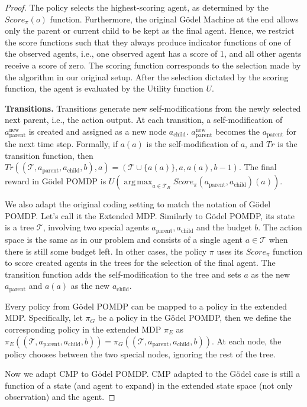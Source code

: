 \documentclass{article}
\DeclareMathOperator*{\argmax}{arg\,max}
\begin{document}
\begin{proof}
The policy selects the highest-scoring agent, as determined by the $Score_\pi(o)$ function. Furthermore, the original G\"odel Machine at the end allows only the parent or current child to be kept as the final agent. Hence, we restrict the score functions such that they always produce indicator functions of one of the observed agents, i.e., one observed agent has a score of 1, and all other agents receive a score of zero. The scoring function corresponds to the selection made by the algorithm in our original setup. After the selection dictated by the scoring function, the agent is evaluated by the Utility function $U$.


\textbf{Transitions.}
Transitions generate new self-modifications from the newly selected next parent, i.e., the action output. At each transition, a self-modification of $a^\text{new}_\text{parent}$ is created and assigned as a new node $a_\text{child}$. $a^\text{new}_\text{parent}$ becomes the $a_\text{parent}$ for the next time step.
Formally, if $a(a)$ is the self-modification of $a$, and $Tr$ is the transition function, then $Tr((\mathcal{T}, a_\text{parent}, a_\text{child}, b), a) = (\mathcal{T} \cup \{a(a)\}, a, a(a), b-1)$. The final reward in G\"odel POMDP is $U(\argmax_{a \in \mathcal{T}_B} Score_\pi(a_\text{parent}, a_\text{child})(a))$. 


We also adapt the original coding setting to match the notation of G\"odel POMDP. Let's call it the Extended MDP. Similarly to G\"odel POMDP, its state is a tree $\mathcal{T}$, involving two special agents $a_\text{parent}, a_\text{child}$ and the budget $b$. The action space is the same as in our problem and consists of a single agent $a \in \mathcal{T}$ when there is still some budget left.
In other cases, the policy $\pi$ uses its $Score_\pi$ function to score created agents in the trees for the selection of the final agent. The transition function adds the self-modification to the tree and sets $a$ as the new $a_\text{parent}$ and $a(a)$ as the new $a_\text{child}$.

Every policy from G\"odel POMDP can be mapped to a policy in the extended MDP. Specifically, let $\pi_G$ be a policy in the G\"odel POMDP, then we define the corresponding policy in the extended MDP $\pi_E$ as $\pi_E((\mathcal{T}, a_\text{parent}, a_\text{child}, b)) = \pi_G((\mathcal{T}, a_\text{parent},a_\text{child}, b))$. At each node, the policy chooses between the two special nodes, ignoring the rest of the tree. 

 

Now we adapt $\mathrm{CMP}$ to G\"odel POMDP. $\mathrm{CMP}$ adapted to the G\"odel case is still a function of a state (and agent to expand) in the extended state space (not only observation) and the agent.


\end{proof}
\end{document}
